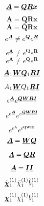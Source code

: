 \documentclass[9pt,headings=standardclasses,parskip=half]{scrartcl}
\newcommand*\matrspace{0.8mu}
\newcommand{\matr}[1]{\mspace{\matrspace}\underline{\mspace{-\matrspace}\smash[b]{\boldsymbol{#1}}\mspace{-\matrspace}}\mspace{\matrspace}}
\begin{document}
\pagestyle{empty}


\[
  \matr{A} = \matr{Q}\matr{R} \boldsymbol{x}
\]
\[
  \underline{\boldsymbol{A}} = \underline{\boldsymbol{Q}}\underline{\boldsymbol{R}} \boldsymbol{x}
\]
\[
  \boldsymbol{A} = \boldsymbol{Q}\boldsymbol{R} \boldsymbol{x}
\]
\[
  e^{\matr{A}} \neq e^{\matr{Q}}e^{\matr{R}}
\]
\[
  e^{\underline{\boldsymbol{A}}} \neq e^{\underline{\boldsymbol{Q}}}e^{\underline{\boldsymbol{R}}}
\]
\[
  e^{\boldsymbol{A}} \neq e^{\boldsymbol{Q}}e^{\boldsymbol{R}}
\]
\[
  \matr{A}_1 \matr{W}\matr{Q}_1 \matr{R}\matr{I}
\]
\[
  A_1 \matr{W} Q_1 \matr{R}\matr{I}
\]
\[
  e^{\matr{A}}e^{\matr{Q}\matr{W}\matr{R}\matr{I}}
\]
\[
  e^{e^{\matr{A}}}e^{e^{\matr{Q}\matr{W}\matr{R}\matr{I}}}
\]
\[
  e^{e^{\boldsymbol{A}}}e^{e^{\boldsymbol{Q}\boldsymbol{W}\boldsymbol{R}\boldsymbol{I}}}
\]
\[
  \matr{A} = \matr{W}\matr{Q}
\]
\[
  \matr{A} = \matr{Q}\matr{R}
\]
\[
  \matr{A} = \matr{I}\matr{I}
\]
\[
\tilde{\matr{\chi}}_1^{(1)} \tilde{\chi}_1^{(1)} \tilde{b}_1^{(1)}
\]
\[
\matr{\chi}_1^{(1)} \chi_1^{(1)} b_1^{(1)}
\]













\end{document}
